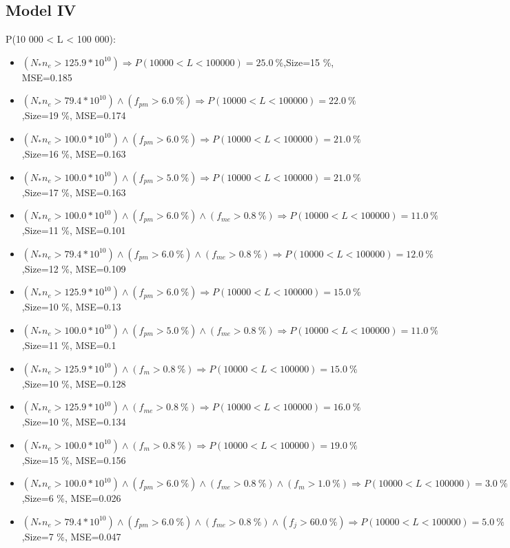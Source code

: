 \documentclass[numbered]{CSL}
\begin{document}
\subsection{Model IV}
P(10 000 < L < 100 000):
\begin{itemize}
\item $(N_* n_e > 125.9 * 10^{10}) \Rightarrow P(10 000 < L < 100 000) = 25.0~\%$,\hfill Size=15 \%, MSE=0.185
\item $(N_* n_e > 79.4 * 10^{10}) \land (f_{pm} > 6.0~\%) \Rightarrow P(10 000 < L < 100 000) = 22.0~\%$,\hfill Size=19 \%, MSE=0.174
\item $(N_* n_e > 100.0 * 10^{10}) \land (f_{pm} > 6.0~\%) \Rightarrow P(10 000 < L < 100 000) = 21.0~\%$,\hfill Size=16 \%, MSE=0.163
\item $(N_* n_e > 100.0 * 10^{10}) \land (f_{pm} > 5.0~\%) \Rightarrow P(10 000 < L < 100 000) = 21.0~\%$,\hfill Size=17 \%, MSE=0.163
\item $(N_* n_e > 100.0 * 10^{10}) \land (f_{pm} > 6.0~\%) \land (f_{me} > 0.8~\%) \Rightarrow P(10 000 < L < 100 000) = 11.0~\%$,\hfill Size=11 \%, MSE=0.101
\item $(N_* n_e > 79.4 * 10^{10}) \land (f_{pm} > 6.0~\%) \land (f_{me} > 0.8~\%) \Rightarrow P(10 000 < L < 100 000) = 12.0~\%$,\hfill Size=12 \%, MSE=0.109
\item $(N_* n_e > 125.9 * 10^{10}) \land (f_{pm} > 6.0~\%) \Rightarrow P(10 000 < L < 100 000) = 15.0~\%$,\hfill Size=10 \%, MSE=0.13
\item $(N_* n_e > 100.0 * 10^{10}) \land (f_{pm} > 5.0~\%) \land (f_{me} > 0.8~\%) \Rightarrow P(10 000 < L < 100 000) = 11.0~\%$,\hfill Size=11 \%, MSE=0.1
\item $(N_* n_e > 125.9 * 10^{10}) \land (f_m > 0.8~\%) \Rightarrow P(10 000 < L < 100 000) = 15.0~\%$,\hfill Size=10 \%, MSE=0.128
\item $(N_* n_e > 125.9 * 10^{10}) \land (f_{me} > 0.8~\%) \Rightarrow P(10 000 < L < 100 000) = 16.0~\%$,\hfill Size=10 \%, MSE=0.134
\item $(N_* n_e > 100.0 * 10^{10}) \land (f_m > 0.8~\%) \Rightarrow P(10 000 < L < 100 000) = 19.0~\%$,\hfill Size=15 \%, MSE=0.156
\item $(N_* n_e > 100.0 * 10^{10}) \land (f_{pm} > 6.0~\%) \land (f_{me} > 0.8~\%) \land (f_m > 1.0~\%) \Rightarrow P(10 000 < L < 100 000) = 3.0~\%$,\hfill Size=6 \%, MSE=0.026
\item $(N_* n_e > 79.4 * 10^{10}) \land (f_{pm} > 6.0~\%) \land (f_{me} > 0.8~\%) \land (f_j > 60.0~\%) \Rightarrow P(10 000 < L < 100 000) = 5.0~\%$,\hfill Size=7 \%, MSE=0.047

\end{itemize}
\end{document}
